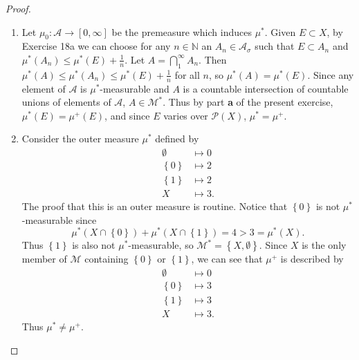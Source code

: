 \documentclass{article}
\theoremstyle{definition}
\begin{document}
\begin{proof}
\begin{enumerate}[label=\textbf{\alph*.}]
		      On the other hand, if $\mu^*(E) = \mu^+(E)$, then choose for $n \in \mathbb{N}$ an $A_n \in \mathscr{M}^*$ such that $E \subset A_n$ and $\mu^*(A_n) \leq \mu^+(E) + \frac{1}{n} = \mu^*(E) + \frac{1}{n}$ (Exercise 18a).
		      Then clearly $\mu^*(\bigcap_1^\infty A_n) = \mu^*(E)$, and $\bigcap_1^\infty A_n \in \mathscr{M}^*$ since $\mathscr{M}^*$ is a $\sigma$-algebra.
		\item Let $\mu_0: \mathscr{A} \to [0, \infty]$ be the premeasure which induces $\mu^*$.
		      Given $E \subset X$, by Exercise 18a we can choose for any $n \in \mathbb{N}$ an $A_n \in \mathscr{A}_\sigma$ such that $E \subset A_n$ and $\mu^*(A_n) \leq \mu^*(E) + \frac{1}{n}$.
		      Let $A = \bigcap_1^\infty A_n$.
		      Then $\mu^*(A) \leq \mu^*(A_n) \leq \mu^*(E) + \frac{1}{n}$ for all $n$, so $\mu^*(A) = \mu^*(E)$.
		      Since any element of $\mathscr{A}$ is $\mu^*$-measurable and $A$ is a countable intersection of countable unions of elements of $\mathscr{A}$, $A \in \mathscr{M}^*$.
		      Thus by part \textbf{a} of the present exercise, $\mu^*(E) = \mu^+(E)$, and since $E$ varies over $\mathscr{P}(X)$, $\mu^* = \mu^+$.
		\item Consider the outer measure $\mu^*$ defined by \begin{align*}
			      \emptyset                    & \mapsto 0  \\
			      \left\lbrace 0 \right\rbrace & \mapsto 2  \\
			      \left\lbrace 1 \right\rbrace & \mapsto 2  \\
			      X                            & \mapsto 3.
		      \end{align*}
		      The proof that this is an outer measure is routine.
		      Notice that $\left\lbrace 0 \right\rbrace$ is not $\mu^*$-measurable since \begin{equation*}
			      \mu^*(X \cap \left\lbrace 0 \right\rbrace) + \mu^*(X \cap \left\lbrace 1 \right\rbrace) = 4 > 3 = \mu^*(X).
		      \end{equation*}
		      Thus $\left\lbrace 1 \right\rbrace$ is also not $\mu^*$-measurable, so $\mathscr{M}^* = \left\lbrace X, \emptyset \right\rbrace$.
		      Since $X$ is the only member of $\mathscr{M}$ containing $\left\lbrace 0 \right\rbrace$ or $\left\lbrace 1 \right\rbrace$, we can see that $\mu^+$ is described by \begin{align*}
			      \emptyset                    & \mapsto 0  \\
			      \left\lbrace 0 \right\rbrace & \mapsto 3  \\
			      \left\lbrace 1 \right\rbrace & \mapsto 3  \\
			      X                            & \mapsto 3.
		      \end{align*}
		      Thus $\mu^* \neq \mu^+$.
	\end{enumerate}
\end{proof}
\end{document}
